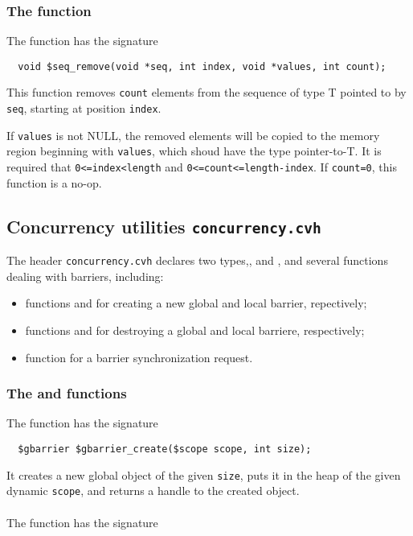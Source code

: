 \subsubsection{The \cseqrm{} function}
The \cseqrm{} function has the signature
\begin{verbatim}
  void $seq_remove(void *seq, int index, void *values, int count);
\end{verbatim}

This function removes \texttt{count} elements from the sequence of type T pointed to by \texttt{seq}, starting at position
\texttt{index}. 

If \texttt{values} is not NULL, the removed elements will be copied to the memory region beginning with \texttt{values}, which shoud have the type pointer-to-T. It is required that \texttt{0<=index<length} and \texttt{0<=count<=length-index}. If \texttt{count=0}, this function is a no-op.

\subsection{Concurrency utilities \texttt{concurrency.cvh}}
\label{subsec:concurrencyLibrary}

The header \texttt{concurrency.cvh} declares two types,, \cgbarrier{} and \cbarrier{}, and several functions dealing with barriers, including:
\begin{itemize}
\item functions \cgbarriercreate{} and \cbarriercreate{} for creating a new global and local barrier, repectively;
\item functions \cgbarrierdestroy{} and \cbarrierdestroy{} for destroying a global and local barriere, respectively;
\item function \cbarriercall{} for a barrier synchronization request.
\end{itemize}


\subsubsection{The \cgbarriercreate{} and \cbarriercreate{} functions}
The \cgbarriercreate{} function has the signature

\begin{verbatim}
  $gbarrier $gbarrier_create($scope scope, int size);
\end{verbatim}

It creates a new global object of the given \texttt{size}, puts it in the heap of the given dynamic \texttt{scope}, and returns a handle to the created \cgbarrier{} object.
\\~\\
The \cbarriercreate{} function has the signature


